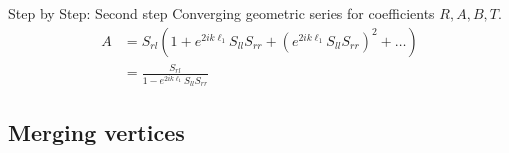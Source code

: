 \documentclass{beamer}
\begin{document}
  \begin{frame}{Step by Step: Second step}
    Converging geometric series for coefficients $R, A, B, T$.
    \vspace{1em}
    \begin{align*}
      A &= S_{rl} \left(1 + e^{2ik\ell_1} S_{ll} S_{rr} + \left(e^{2ik\ell_1} S_{ll} S_{rr}\right)^2 + \ldots \right) \\[1.5em]
      &= \frac{S_{rl}}{1-e^{2ik\ell_1}S_{ll}S_{rr}}
    \end{align*}
  \end{frame}


  \subsection{Merging vertices}
\end{document}
